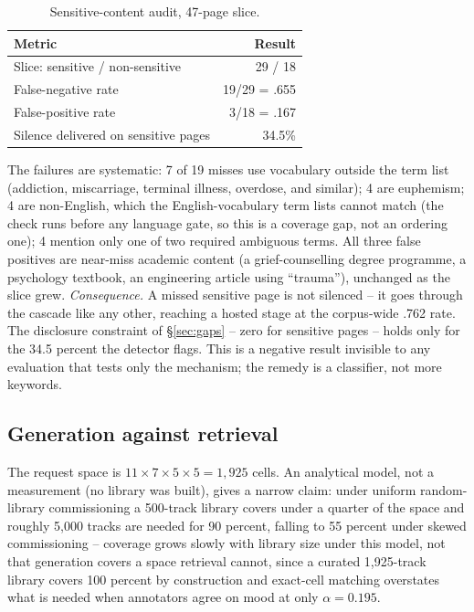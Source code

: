 \documentclass[conference]{IEEEtran}
\let\IEEEoriginalcaption\caption
\renewcommand{\caption}[1]{\IEEEoriginalcaption{\footnotesize #1}}
\begin{document}
\begin{table}[t]
\caption{Sensitive-content audit, 47-page slice.}
\label{tab:sensitive}
\begin{center}
\scriptsize
\begin{tabular}{lr}
\toprule
\textbf{Metric} & \textbf{Result} \\
\midrule
Slice: sensitive / non-sensitive & 29 / 18 \\
False-negative rate & 19/29 = .655 \\
False-positive rate & 3/18 = .167 \\
Silence delivered on sensitive pages & 34.5\% \\
\bottomrule
\end{tabular}
\end{center}
\end{table}

The failures are systematic: 7 of 19 misses use vocabulary outside the
term list (addiction, miscarriage, terminal illness, overdose, and
similar); 4 are euphemism; 4 are non-English, which the
English-vocabulary term lists cannot match (the check runs before any
language gate, so this is a coverage gap, not an ordering one); 4 mention
only one of two required ambiguous terms. All three false positives are
near-miss academic content (a grief-counselling degree programme, a
psychology textbook, an engineering article using ``trauma''), unchanged
as the slice grew. \emph{Consequence.} A missed sensitive page is not
silenced -- it goes through the cascade like any other, reaching a hosted
stage at the corpus-wide .762 rate. The disclosure constraint of
\S\ref{sec:gaps} -- zero for sensitive pages -- holds only for the 34.5
percent the detector flags. This is a negative result invisible to any
evaluation that tests only the mechanism; the remedy is a classifier, not
more keywords.

\subsection{Generation against retrieval}
\label{sec:res-retrieval}

The request space is $11\times7\times5\times5=1{,}925$ cells. An
analytical model, not a measurement (no library was built), gives a
narrow claim: under uniform random-library commissioning a 500-track
library covers under a quarter of the space and roughly 5,000 tracks are
needed for 90 percent, falling to 55 percent under skewed commissioning
-- coverage grows slowly with library size under this model, not that
generation covers a space retrieval cannot, since a curated 1,925-track
library covers 100 percent by construction and exact-cell matching
overstates what is needed when annotators agree on mood at only
$\alpha=0.195$.
\end{document}
